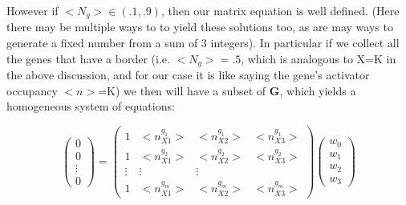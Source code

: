 However if $<N_{g}> \in (.1,.9)$, then our matrix equation is well defined.  (Here there may be multiple ways to to yield these solutions too, as are may ways to generate a fixed number from a sum of 3 integers). In particular if we collect all the genes that have a border (i.e.  $<N_{g}> = .5$, which is analogous to X=K in the above discussion, and for our case it is like saying the gene's activator occupancy $<n>$=K) we then will have a subset of \textbf{G}, which yields a homogeneous system of equations:



\[
\begin{pmatrix} 0\\0\\ \vdots \\ 0\end{pmatrix}=
 \begin{pmatrix}
     1&<n_{X1}^{g_1}> & <n_{X2}^{g_1}> & <n_{X3}^{g_1}>  \\
   1&<n_{X1}^{g_2}> & <n_{X2}^{g_2}> & <n_{X3}^{g_2}> \\
    \vdots & \vdots & \vdots \\
   1&<n_{X1}^{g_m}> & <n_{X2}^{g_m}> & <n_{X3}^{g_m}>
 \end{pmatrix} \begin{pmatrix} w_0 \\ w_1 \\ w_2 \\ w_3 \end{pmatrix}
\]

